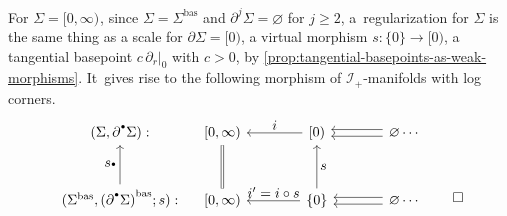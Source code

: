 \documentclass[JEP,XML,SOM,Unicode,NoFloatCountersInSection,published]{cedram}
\let\oldbullet\bullet
\renewcommand{\bullet}{{\raisebox{1pt}{$\scriptscriptstyle\oldbullet$}}}
\let\tst\textstyle
\theoremstyle{definition}
\theoremstyle{remark}
\newenvironment{example}
  {\pushQED{\qed}\renewcommand{\qedsymbol}{$\lozenge$}\examplex}
  {\popQED\endexamplex}
\newcommand{\halfspc}[1]{[0,\infty)^{#1}}
\renewcommand{\ge}{\geqslant}
\newcommand{\Sig}{\Sigma}
\newcommand{\bas}[1]{{#1}^{\mathrm{bas}}}
\newcommand{\Sigbas}{\bas{\Sig}}
\newcommand{\bdSig}[1][]{\partial^{#1}\Sigma}
\newcommand{\ascat}{\mathscr{I}_+}
\begin{document}
\begin{example}
For $\Sig=\halfspc{}$, since $\Sig=\Sigbas$ and $\partial^j\Sig=\varnothing$ for $j\ge 2$, a~regularization for $\Sig$ is the same thing as a scale for $\partial\Sig=[0)$, \ie a virtual morphism $s:\{0\}\to [0)$, \ie a tangential basepoint $c\,\partial_r|_0$ with $c>0$, by \autoref{prop:tangential-basepoints-as-weak-morphisms}. It~gives rise to the following morphism of $\ascat$-manifolds with log corners.
\[
\begin{tikzcd}[row sep = 1cm,baseline=-0.9cm]
(\Sig,\partial^\bullet\Sig): &[-.5cm] {[0,\infty)} &[.5cm] {[0)} \ar[l,"\tst i"'] &[.4cm] \varnothing \ar[l,shift left] \ar[l,shift right] \cdots \\
(\Sigbas,\bas{(\bdSig[\bullet])};s): \ar[u,"\tst s_\bullet"]& {[0,\infty)} \ar[u,equal] & \{0\} \ar[l,"\tst i'=i\circ s"']\ar[u,"\tst s"'] & \varnothing \ar[l,shift left] \ar[l,shift right] \cdots
\end{tikzcd}\qedhere
\]
\end{example}
\end{document}
